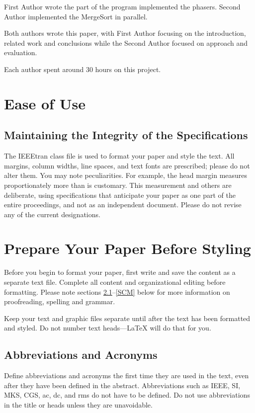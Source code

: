 \documentclass[conference]{IEEEtran}
\begin{document}
First Author wrote the part of the program implemented the phasers. Second Author implemented the MergeSort in parallel. 

Both authors wrote this paper, with First Author focusing on the introduction, related work and conclusions while the Second Author focused on approach and evaluation.

Each author spent around 30 hours on this project.




\section{Ease of Use}

\subsection{Maintaining the Integrity of the Specifications}

The IEEEtran class file is used to format your paper and style the text. All margins, 
column widths, line spaces, and text fonts are prescribed; please do not 
alter them. You may note peculiarities. For example, the head margin
measures proportionately more than is customary. This measurement 
and others are deliberate, using specifications that anticipate your paper 
as one part of the entire proceedings, and not as an independent document. 
Please do not revise any of the current designations.

\section{Prepare Your Paper Before Styling}
Before you begin to format your paper, first write and save the content as a 
separate text file. Complete all content and organizational editing before 
formatting. Please note sections \ref{AA}--\ref{SCM} below for more information on 
proofreading, spelling and grammar.

Keep your text and graphic files separate until after the text has been 
formatted and styled. Do not number text heads---{\LaTeX} will do that 
for you.

\subsection{Abbreviations and Acronyms}\label{AA}
Define abbreviations and acronyms the first time they are used in the text, 
even after they have been defined in the abstract. Abbreviations such as 
IEEE, SI, MKS, CGS, ac, dc, and rms do not have to be defined. Do not use 
abbreviations in the title or heads unless they are unavoidable.
\end{document}
